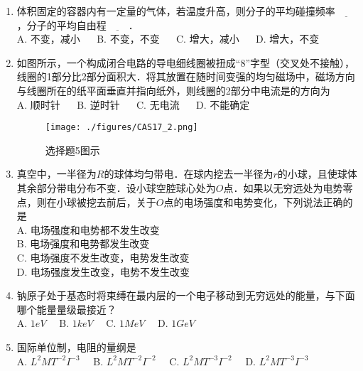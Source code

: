 \begin{enumerate}
\item 体积固定的容器内有一定量的气体，若温度升高，则分子的平均碰撞频率$\underline{~~~~~~~~~~}$，分子的平均自由程$\underline{~~~~~~~~~~}$．\\
A. 不变，减小 $\quad$
B. 不变，不变 $\quad$
C. 增大，减小 $\quad$
D. 增大，不变 $\quad$

\item 如图所示，一个构成闭合电路的导电细线圈被扭成“8”字型（交叉处不接触），线圈的1部分比2部分面积大．将其放置在随时间变强的均匀磁场中，磁场方向与线圈所在的纸平面垂直并指向纸外，则线圈的2部分中电流是的方向为\\
A. 顺时针 $\quad$
B. 逆时针 $\quad$
C. 无电流 $\quad$
D. 不能确定 $\quad$
\begin{figure}[ht]
\centering
\texttt{[image: ./figures/CAS17\_2.png]}
\caption{选择题5图示} \label{CAS17_fig2}
\end{figure}
\item 真空中，一半径为$R$的球体均匀带电．在球内挖去一半径为$r$的小球，且使球体其余部分带电分布不变．设小球空腔球心处为$O$点．如果以无穷远处为电势零点，则在小球被挖去前后，关于$O$点的电场强度和电势变化，下列说法正确的是\\
A. 电场强度和电势都不发生改变 \\
B. 电场强度和电势都发生改变 \\
C. 电场强度不发生改变，电势发生改变 \\
D. 电场强度发生改变，电势不发生改变 \\
\item 钠原子处于基态时将束缚在最内层的一个电子移动到无穷远处的能量，与下面哪个能量量级最接近？\\
A. $1eV\quad$
B. $1keV\quad$
C. $1MeV\quad$
D. $1GeV\quad$
\item 国际单位制，电阻的量纲是\\
A. $L^{2}MT^{-2}I^{-3}\quad$
B. $L^{2}MT^{-2}I^{-2}\quad$
C. $L^{2}MT^{-3}I^{-2}\quad$
D. $L^{2}MT^{-3}I^{-3}\quad$
\end{enumerate}
